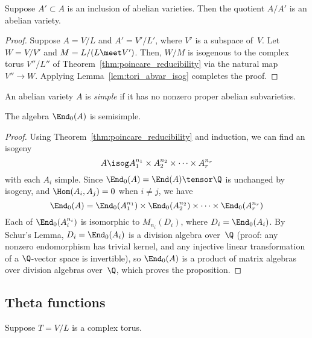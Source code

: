 \documentclass{report}
\begin{document}
\begin{proposition}
Suppose $A'\subset A$ is an inclusion of abelian varieties.  Then
the quotient $A/A'$ is an abelian variety.
\end{proposition}
\begin{proof}
Suppose $A=V/L$ and $A'=V'/L'$, where $V'$ is a subspace of~$V$.
Let $W=V/V'$ and $M=L/(L\meet V')$.  Then, $W/M$ is isogenous to
the complex torus $V''/L''$ of
Theorem~\ref{thm:poincare_reducibility} via the natural map
$V''\to W$.  Applying Lemma~\ref{lem:tori_abvar_isog} completes
the proof.
\end{proof}

\begin{definition}
An abelian variety $A$ is {\em simple} if it has no nonzero proper
abelian subvarieties.
\end{definition}

\begin{proposition}
The algebra $\End_0(A)$ is semisimple.
\end{proposition}
\begin{proof}
Using Theorem~\ref{thm:poincare_reducibility} and induction, we
can find an isogeny
\[
  A \isog A_1^{n_1}\times A_2^{n_2}\times \cdots \times A_r^{n_r}
\]
with each $A_i$ simple.  Since $\End_0(A)=\End(A)\tensor\Q$ is
unchanged by isogeny, and $\Hom(A_i,A_j)=0$ when $i\neq j$, we
have
\[
 \End_0(A) = \End_0(A_1^{n_1}) \times \End_0(A_2^{n_2}) \times
 \cdots \times \End_0(A_r^{n_r})
\]
Each of $\End_0(A_i^{n_i})$ is isomorphic to $M_{n_i}(D_i)$, where
$D_i=\End_0(A_i)$.  By Schur's Lemma, $D_i=\End_0(A_i)$ is a
division algebra over~$\Q$ (proof: any nonzero endomorphism has
trivial kernel, and any injective linear transformation of a
$\Q$-vector space is invertible), so $\End_0(A)$ is a product of
matrix algebras over division algebras over~$\Q$, which proves the
proposition.
\end{proof}


\subsection{Theta functions}

Suppose $T=V/L$ is a complex torus.
\end{document}
